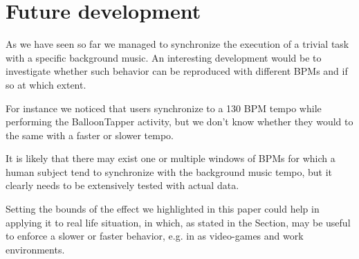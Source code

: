 
\section{Future development}
As we have seen so far we managed to synchronize the execution of a trivial task with a specific background music. An interesting development would be to investigate whether such behavior can be reproduced with different BPMs and if so at which extent.

For instance we noticed that users synchronize to a 130 BPM tempo while performing the BalloonTapper activity, but we don't know whether they would to the same with a faster or slower tempo.

It is likely that there may exist one or multiple windows of BPMs for which a human subject tend to synchronize with the background music tempo, but it clearly needs to be extensively tested with actual data.

Setting the bounds of the effect we highlighted in this paper could help in applying it to real life situation, in which, as stated in the  Section, may be useful to enforce a slower or faster behavior, e.g. in as video-games and work environments.